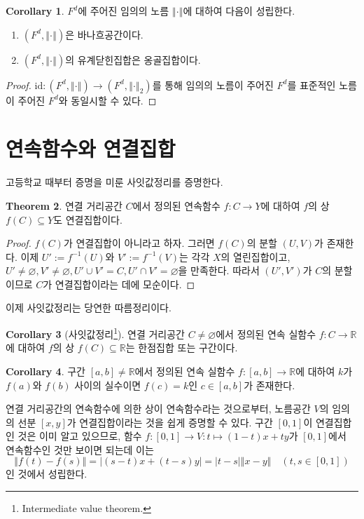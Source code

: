 \documentclass[11pt]{book}
\numberwithin{equation}{chapter}
\def\RR{\mathbb{R}}
\def\id{\text{id}}
\newcommand{\abs}[1]{\left\vert#1\right\vert}
\newcommand{\norm}[1]{\left\Vert#1\right\Vert}
\theoremstyle{definition}
\newtheorem{thm}{Theorem}[section]
\newtheorem{cor}[thm]{Corollary}
\newenvironment{enum}
	{\begin{enumerate}[label=(\alph*), leftmargin=2\parindent]}
	{\end{enumerate}}
\begin{document}
\begin{cor}
    \(F^d\)에 주어진 임의의 노름 \(\norm{\cdot}\)에 대하여 다음이 성립한다.
    \begin{enum}
        \item \((F^d, \norm{\cdot})\)은 바나흐공간이다.
        \item \((F^d, \norm{\cdot})\)의 유계닫힌집합은 옹골집합이다.
    \end{enum}
\end{cor}
\begin{proof}
    \(\id : (F^d, \norm{\cdot}) \to (F^d, \norm{\cdot}_2)\)를 통해 임의의 노름이 주어진 \(F^d\)를 표준적인 노름이 주어진 \(F^d\)와 동일시할 수 있다.
\end{proof}

\section{연속함수와 연결집합}

고등학교 때부터 증명을 미룬 사잇값정리를 증명한다.

\begin{thm}
    연결 거리공간 \(C\)에서 정의된 연속함수 \(f : C \to Y\)에 대하여 \(f\)의 상 \(f(C) \subseteq Y\)도 연결집합이다.
\end{thm}
\begin{proof}
    \(f(C)\)가 연결집합이 아니라고 하자. 그러면 \(f(C)\)의 분할 \((U, V)\)가 존재한다. 이제 \(U' := f^{-1}(U)\)와 \(V' := f^{-1}(V)\)는 각각 \(X\)의 열린집합이고, \(U' \ne \varnothing, V' \ne \varnothing, U' \cup V' = C, U' \cap V' = \varnothing\)을 만족한다. 따라서 \((U', V')\)가 \(C\)의 분할이므로 \(C\)가 연결집합이라는 데에 모순이다.
\end{proof}

이제 사잇값정리는 당연한 따름정리이다.

\begin{cor}[사잇값정리\footnote{Intermediate value theorem.}]
    연결 거리공간 \(C \ne \varnothing\)에서 정의된 연속 실함수 \(f : C \to \RR\)에 대하여 \(f\)의 상 \(f(C) \subseteq \RR\)는 한점집합 또는 구간이다.
\end{cor}
\begin{cor}
    구간 \([a, b] \ne \RR\)에서 정의된 연속 실함수 \(f : [a, b] \to \RR\)에 대하여 \(k\)가 \(f(a)\)와 \(f(b)\) 사이의 실수이면 \(f(c) = k\)인 \(c \in [a, b]\)가 존재한다.
\end{cor}

연결 거리공간의 연속함수에 의한 상이 연속함수라는 것으로부터, 노름공간 \(V\)의 임의의 선분 \([x, y]\)가 연결집합이라는 것을 쉽게 증명할 수 있다. 구간 \([0, 1]\)이 연결집합인 것은 이미 알고 있으므로, 함수 \(f : [0, 1] \to V : t \mapsto (1-t)x + ty \)가 \([0, 1]\)에서 연속함수인 것만 보이면 되는데 이는
\[
    \norm{f(t) - f(s)} = \abs{(s-t)x + (t-s)y} = \abs{t-s}\norm{x-y} \quad (t, s \in [0, 1])
\]
인 것에서 성립한다.
\end{document}
